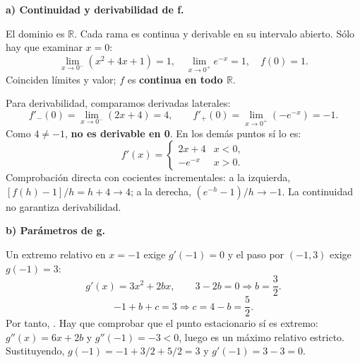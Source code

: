 \textbf{a) Continuidad y derivabilidad de f.}\par\nopagebreak[4]
El dominio es $\mathbb R$. Cada rama es continua y derivable en su intervalo abierto. Sólo hay que examinar $x=0$:
\[
\lim_{x\to0^-}(x^2+4x+1)=1,\quad
\lim_{x\to0^+}e^{-x}=1,\quad f(0)=1.
\]
Coinciden límites y valor; $f$ es \textbf{continua en todo $\mathbb R$}.

Para derivabilidad, comparamos derivadas laterales:
\[
f'_-(0)=\lim_{x\to0^-}(2x+4)=4,\qquad
f'_+(0)=\lim_{x\to0^+}(-e^{-x})=-1.
\]
Como $4\ne-1$, \textbf{no es derivable en 0}. En los demás puntos sí lo es:
\[
f'(x)=\begin{cases}2x+4&x<0,\\-e^{-x}&x>0.\end{cases}
\]
Comprobación directa con cocientes incrementales: a la izquierda, $[f(h)-1]/h=h+4\to4$; a la derecha, $(e^{-h}-1)/h\to-1$. La continuidad no garantiza derivabilidad.

\textbf{b) Parámetros de g.}\par\nopagebreak[4]
Un extremo relativo en $x=-1$ exige $g'(-1)=0$ y el paso por $(-1,3)$ exige $g(-1)=3$:
\[
g'(x)=3x^2+2bx,\qquad 3-2b=0\Rightarrow b=\frac32.
\]
\[
-1+b+c=3\Rightarrow c=4-b=\frac52.
\]
Por tanto, . Hay que comprobar que el punto estacionario sí es extremo: $g''(x)=6x+2b$ y $g''(-1)=-3<0$, luego es un máximo relativo estricto. Sustituyendo, $g(-1)=-1+3/2+5/2=3$ y $g'(-1)=3-3=0$.
